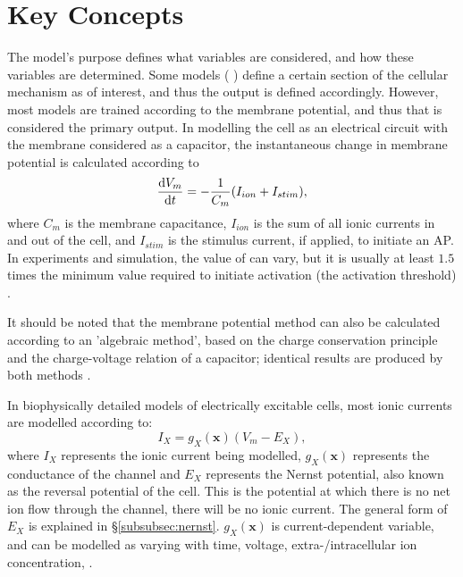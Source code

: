 \documentclass[../thesis-main.tex]{subfiles}
\begin{document}
\section{Key Concepts}
\label{sec:model-concepts}
The model's purpose defines what variables are considered, and how these variables are determined. Some models (\eg{} \citet{Restrepo2008}) define a certain section of the cellular mechanism as of interest, and thus the output is defined accordingly. However, most models are trained according to the membrane potential, and thus that is considered the primary output. In modelling the cell as an electrical circuit with the membrane considered as a capacitor, the instantaneous change in membrane potential is calculated according to
\begin{equation}
 \frac{\textnormal{d}V_m}{\textnormal{d}t} = -\frac{1}{C_m}(I_{ion}+I_{stim}),
\end{equation}
where $C_m$ is the membrane capacitance, $I_{ion}$ is the sum of all ionic currents in and out of the cell, and $I_{stim}$ is the stimulus current, if applied, to initiate an AP. In experiments and simulation, the value of \istim{} can vary, but it is usually at least $1.5$ times the minimum value required to initiate activation (the activation threshold) \citep{Sutton2000, Riccio1999, Ferrero2003}.

It should be noted that the membrane potential method can also be calculated according to an 'algebraic method', based on the charge conservation principle and the charge-voltage relation of a capacitor; identical results are produced by both methods \citep{Hund2001, Rudy2006}.

In biophysically detailed models of electrically excitable cells, most ionic currents are modelled according to:
\begin{equation}
 I_X = g_X(\mathbf{x})(V_m-E_X), \label{eq:ion-current}
\end{equation}
where $I_X$ represents the ionic current being modelled, $g_X(\mathbf{x})$ represents the conductance of the channel and $E_X$ represents the Nernst potential, also known as the reversal potential of the cell. This is the potential at which there is no net ion flow through the channel, \idest{} there will be no ionic current. The general form of $E_X$ is explained in \S\ref{subsubsec:nernst}. $g_X(\mathbf{x})$ is current-dependent variable, and can be modelled as varying with time, voltage, extra-/intracellular ion concentration, \etc{}.
\end{document}
